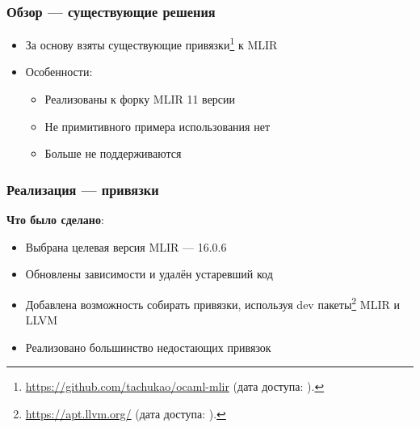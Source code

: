 \documentclass{beamer}
\begin{document}
\begin{frame}[fragile]
	\frametitle{Обзор --- существующие решения}
	\begin{itemize}
		\item За основу взяты существующие привязки\footnote{\url{https://github.com/tachukao/ocaml-mlir} (дата доступа:   ).} к MLIR
		\item Особенности:
		      \begin{itemize}
			      \item Реализованы к форку MLIR 11 версии
			      \item Не примитивного примера использования нет
			      \item Больше не поддерживаются
		      \end{itemize}
	\end{itemize}
\end{frame}

\begin{frame}[fragile]
	\frametitle{Реализация --- привязки}
	\textbf{Что было сделано}:
	\begin{itemize}
		\item Выбрана целевая версия MLIR --- 16.0.6
		\item Обновлены зависимости и удалён устаревший код
		\item Добавлена возможность собирать привязки, используя dev пакеты\footnote{\url{https://apt.llvm.org/} (дата доступа:   ).} MLIR и LLVM
		\item Реализовано большинство недостающих привязок
	\end{itemize}
\end{frame}
\end{document}
